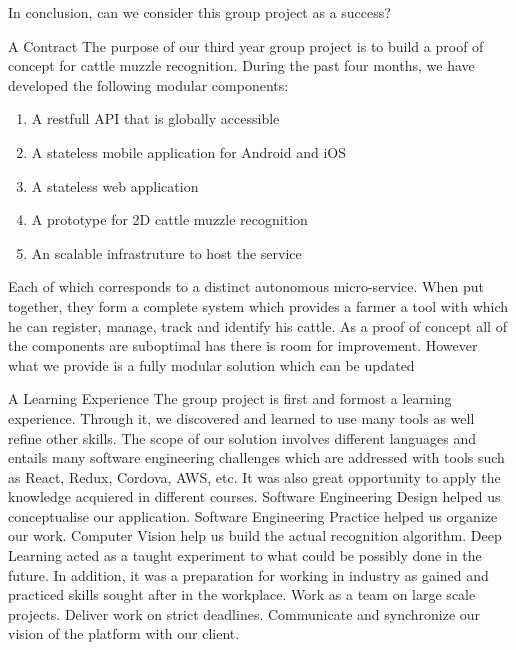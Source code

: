 In conclusion, can we consider this group project as a success?
\begin{subsection}{A Contract}
  The purpose of our third year group project is to build a proof of concept for cattle muzzle recognition. During the past four months, we have developed the following modular components:
  \begin{enumerate}
    \item A restfull API that is globally accessible
    \item A stateless mobile application for Android and iOS
    \item A stateless web application
    \item A prototype for 2D cattle muzzle recognition
    \item An scalable infrastruture to host the service
  \end{enumerate}
  Each of which corresponds to a distinct autonomous micro-service. When put together, they form a complete system which provides a farmer a tool with which he can register, manage, track and identify his cattle. As a proof of concept all of the components are suboptimal has there is room for improvement. However what we provide is a fully modular solution which can be updated
\end{subsection}

\begin{subsection}{A Learning Experience}
  The group project is first and formost a learning experience. Through it, we discovered and learned to use many tools as well refine other skills. The scope of our solution involves different languages and entails many software engineering challenges which are addressed with tools such as React, Redux, Cordova, AWS, etc. It was also great opportunity to apply the knowledge acquiered in different courses. Software Engineering Design helped us conceptualise our application. Software Engineering Practice helped us organize our work. Computer Vision help us build the actual recognition algorithm. Deep Learning acted as a taught experiment to what could be possibly done in the future. In addition, it was a preparation for working in industry as gained and practiced skills sought after in the workplace. Work as a team on large scale projects. Deliver work on strict deadlines. Communicate and synchronize our vision of the platform with our client.
\end{subsection}

